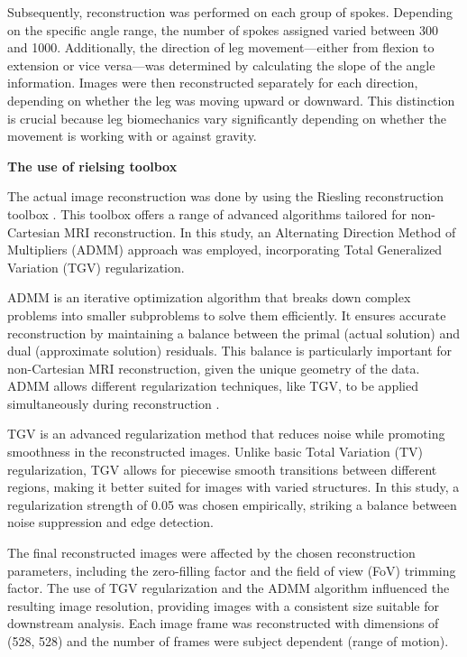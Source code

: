 \documentclass{micro-econ-thesis}
\begin{document}
Subsequently, reconstruction was performed on each group of spokes. Depending on the specific angle range, the number of spokes assigned varied between 300 and 1000. Additionally, the direction of leg movement—either from flexion to extension or vice versa—was determined by calculating the slope of the angle information. Images were then reconstructed separately for each direction, depending on whether the leg was moving upward or downward. This distinction is crucial because leg biomechanics vary significantly depending on whether the movement is working with or against gravity.

\textbf{The use of rielsing toolbox}

The actual image reconstruction was done by using the Riesling reconstruction toolbox \parencite{wood2020riesling}. This toolbox offers a range of advanced algorithms tailored for non-Cartesian MRI reconstruction. In this study, an Alternating Direction Method of Multipliers (ADMM) approach was employed, incorporating Total Generalized Variation (TGV) regularization. 

ADMM is an iterative optimization algorithm that breaks down complex problems into smaller subproblems to solve them efficiently. It ensures accurate reconstruction by maintaining a balance between the primal (actual solution) and dual (approximate solution) residuals. This balance is particularly important for non-Cartesian MRI reconstruction, given the unique geometry of the data. ADMM allows different regularization techniques, like TGV, to be applied simultaneously during reconstruction \parencite{MAL-016}. 

TGV is an advanced regularization method that reduces noise while promoting smoothness in the reconstructed images. Unlike basic Total Variation (TV) regularization, TGV allows for piecewise smooth transitions between different regions, making it better suited for images with varied structures. In this study, a regularization strength of 0.05 was chosen empirically, striking a balance between noise suppression and edge detection.

The final reconstructed images were affected by the chosen reconstruction parameters, including the zero-filling factor and the field of view (FoV) trimming factor. The use of TGV regularization and the ADMM algorithm influenced the resulting image resolution, providing images with a consistent size suitable for downstream analysis. Each image frame was reconstructed with dimensions of (528, 528) and the number of frames were subject dependent (range of motion).
\end{document}

